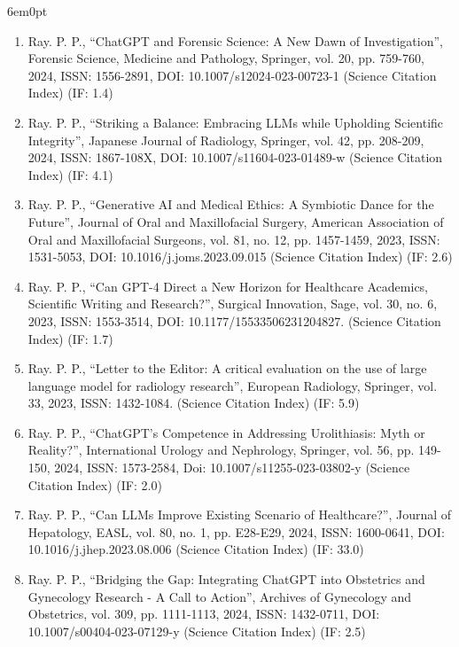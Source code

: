 \documentclass[11pt,a4paper]{moderncv}
\begin{document}
\begin{adjustwidth}{6em}{0pt}
\begin{enumerate}
		\item Ray. P. P., “ChatGPT and Forensic Science: A New Dawn of Investigation”, Forensic Science, Medicine and Pathology, Springer, vol. 20, pp. 759-760, 2024, ISSN: 1556-2891, DOI: 10.1007/s12024-023-00723-1 (Science Citation Index) (IF: 1.4)
		
		\item Ray. P. P., “Striking a Balance: Embracing LLMs while Upholding Scientific Integrity”, Japanese Journal of Radiology, Springer, vol. 42, pp. 208-209, 2024, ISSN: 1867-108X, DOI: 10.1007/s11604-023-01489-w (Science Citation Index) (IF: 4.1)
		
		\item Ray. P. P., “Generative AI and Medical Ethics: A Symbiotic Dance for the Future”, Journal of Oral and Maxillofacial Surgery, American Association of Oral and Maxillofacial Surgeons, vol. 81, no. 12, pp. 1457-1459, 2023, ISSN: 1531-5053, DOI: 10.1016/j.joms.2023.09.015 (Science Citation Index) (IF: 2.6)
		
		\item Ray. P. P., “Can GPT-4 Direct a New Horizon for Healthcare Academics, Scientific Writing and Research?”, Surgical Innovation, Sage, vol. 30, no. 6, 2023, ISSN: 1553-3514, DOI: 10.1177/15533506231204827. (Science Citation Index) (IF: 1.7)
		
		\item Ray. P. P., “Letter to the Editor: A critical evaluation on the use of large language model for radiology research”, European Radiology, Springer, vol. 33, 2023, ISSN: 1432-1084. (Science Citation Index) (IF: 5.9)
		
		\item Ray. P. P., “ChatGPT’s Competence in Addressing Urolithiasis: Myth or Reality?”, International Urology and Nephrology, Springer, vol. 56, pp. 149-150, 2024, ISSN: 1573-2584, Doi: 10.1007/s11255-023-03802-y (Science Citation Index) (IF: 2.0)
		
		\item Ray. P. P., “Can LLMs Improve Existing Scenario of Healthcare?”, Journal of Hepatology, EASL, vol. 80, no. 1, pp. E28-E29, 2024, ISSN: 1600-0641, DOI: 10.1016/j.jhep.2023.08.006 (Science Citation Index) (IF: 33.0)
		
		\item Ray. P. P., “Bridging the Gap: Integrating ChatGPT into Obstetrics and Gynecology Research - A Call to Action”, Archives of Gynecology and Obstetrics, vol. 309, pp. 1111-1113, 2024, ISSN: 1432-0711, DOI: 10.1007/s00404-023-07129-y (Science Citation Index) (IF: 2.5)
		

\end{enumerate}
\end{adjustwidth}
\end{document}
